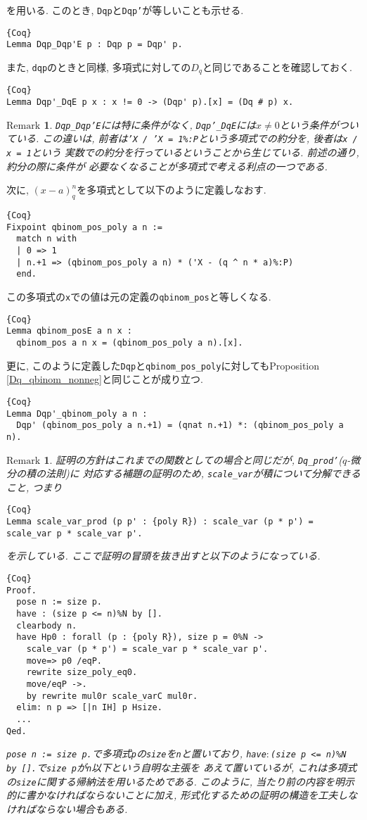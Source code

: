 \documentclass[11pt]{jsreport}
\theoremstyle{mystyle}
\newtheorem{rmk}[df]{$\textrm{Remark}$}
\newcommand{\brmk}{\begin{rmk}}
\newcommand{\ermk}{\end{rmk}}
\newcommand{\0}{\textbf{0}}
\begin{document}
を用いる. このとき, {\tt Dqp}と{\tt Dqp'}が等しいことも示せる. 
\begin{lstlisting}{Coq}
Lemma Dqp_Dqp'E p : Dqp p = Dqp' p. \end{lstlisting}
また, {\tt dqp}のときと同様, 多項式に対しての$D_q$と同じであることを確認しておく. 
\begin{lstlisting}{Coq}
Lemma Dqp'_DqE p x : x != 0 -> (Dqp' p).[x] = (Dq # p) x. \end{lstlisting}
\brmk
  {\tt Dqp\_Dqp'E}には特に条件がなく, {\tt Dqp'\_DqE}には$x \neq 0$という条件がついている. 
  この違いは, 前者は{\tt 'X / 'X = 1\%:P}という多項式での約分を, 後者は{\tt x / x = 1}という
  実数での約分を行っているということから生じている. 前述の通り, 約分の際に条件が
  必要なくなることが多項式で考える利点の一つである. 
\ermk
次に, $(x - a)^n_q$を多項式として以下のように定義しなおす. 
\begin{lstlisting}{Coq}
Fixpoint qbinom_pos_poly a n :=
  match n with
  | 0 => 1
  | n.+1 => (qbinom_pos_poly a n) * ('X - (q ^ n * a)%:P)
  end. \end{lstlisting}
この多項式の{\tt x}での値は元の定義の{\tt qbinom\_pos}と等しくなる. 
\begin{lstlisting}{Coq}
Lemma qbinom_posE a n x :
  qbinom_pos a n x = (qbinom_pos_poly a n).[x].
\end{lstlisting}
更に, このように定義した{\tt Dqp}と{\tt qbinom\_pos\_poly}に対してもProposition \ref{Dq_qbinom_nonneg}と同じことが成り立つ. 
\begin{lstlisting}{Coq}
Lemma Dqp'_qbinom_poly a n :
  Dqp' (qbinom_pos_poly a n.+1) = (qnat n.+1) *: (qbinom_pos_poly a n).
\end{lstlisting}
\brmk
  証明の方針はこれまでの関数としての場合と同じだが, {\tt Dq\_prod'}($q$-微分の積の法則)に
  対応する補題の証明のため, {\tt scale\_var}が積について分解できること, つまり
  \begin{lstlisting}{Coq}
Lemma scale_var_prod (p p' : {poly R}) : scale_var (p * p') = scale_var p * scale_var p'. \end{lstlisting}
  を示している. ここで証明の冒頭を抜き出すと以下のようになっている. 
  \begin{lstlisting}{Coq}
Proof.
  pose n := size p.
  have : (size p <= n)%N by [].
  clearbody n.
  have Hp0 : forall (p : {poly R}), size p = 0%N ->
    scale_var (p * p') = scale_var p * scale_var p'.
    move=> p0 /eqP.
    rewrite size_poly_eq0.
    move/eqP ->.
    by rewrite mul0r scale_varC mul0r.
  elim: n p => [|n IH] p Hsize.
  ...
Qed. \end{lstlisting}
  {\tt pose n := size p.}で多項式{\tt p}の{\tt size}を{\tt n}と置いており, 
  {\tt have$\colon$(size p <= n)\%N by [].}で{\tt size p}が{\tt n}以下という自明な主張を
  あえて置いているが, これは多項式の{\tt size}に関する帰納法を用いるためである. 
  このように, 当たり前の内容を明示的に書かなければならないことに加え, 
  形式化するための証明の構造を工夫しなければならない場合もある. 
\ermk
\end{document}
